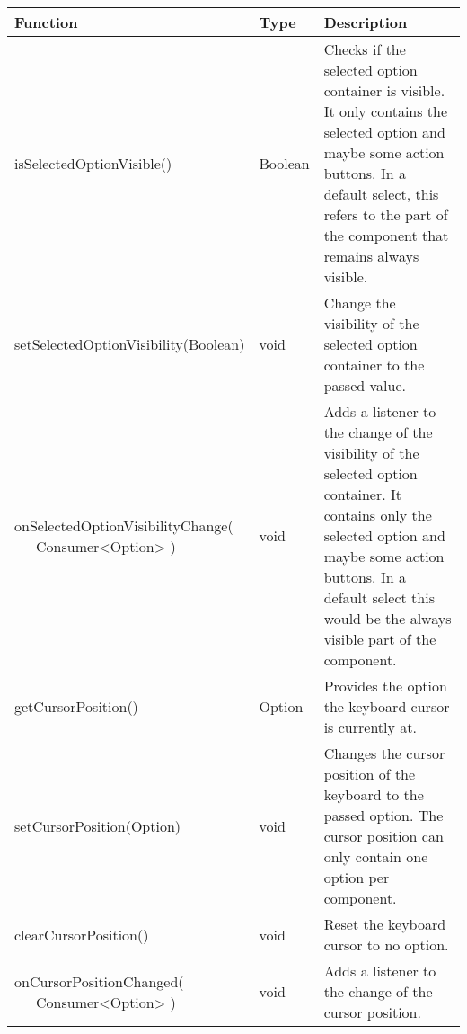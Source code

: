 \clearpage
\begin{table}[!htb] 
    \label{api:selectControllerReturn2}
    \scriptsize
    \setlength\extrarowheight{4pt}
    \begin{tabular}{ p{5cm} p{2.3cm} p{5.2cm} }
        \toprule[0.5pt]
        \textbf{Function}                    & \textbf{Type}          & \textbf{Description} \\
        \midrule    
        isSelectedOptionVisible()            & Boolean                & Checks if the selected option container is visible. 
                                                                        It only contains the selected option and maybe some action buttons.
                                                                        In a default select, this refers to the part of the component that remains always visible. \\
        setSelectedOptionVisibility(Boolean) & void                   & Change the visibility of the selected option container to the passed value. \\
        \tbbr{
            onSelectedOptionVisibilityChange( \\
                \ \ \ Consumer<Option>
            )}                               & void                   & Adds a listener to the change of the visibility of the selected option container. 
                                                                        It contains only the selected option and maybe some action buttons. 
                                                                        In a default select this would be the always visible part of the component. \\
        getCursorPosition()                  & Option                 & Provides the option the keyboard cursor is currently at. \\
        setCursorPosition(Option)            & void                   & Changes the cursor position of the keyboard to the passed option. 
                                                                        The cursor position can only contain one option per component. \\
        clearCursorPosition()                & void                   & Reset the keyboard cursor to no option. \\
        \tbbr{
            onCursorPositionChanged( \\
                \ \ \ Consumer<Option>
            )}                               & void                   & Adds a listener to the change of the cursor position. \\

\end{tabular}
\end{table}
